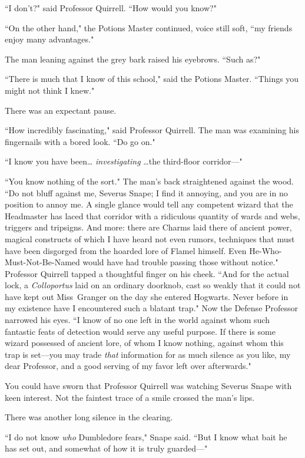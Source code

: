 ``I don't?" said Professor Quirrell. ``How would you know?"

``On the other hand," the Potions Master continued, voice still soft, ``my friends enjoy many advantages."

The man leaning against the grey bark raised his eyebrows. ``Such as?"

``There is much that I know of this school," said the Potions Master. ``Things you might not think I knew."

There was an expectant pause.

``How incredibly fascinating," said Professor Quirrell. The man was examining his fingernails with a bored look. ``Do go on."

``I know you have been{\ldots} \emph{investigating} {\ldots}the third-floor corridor—"

``You know nothing of the sort." The man's back straightened against the wood. ``Do not bluff against me, Severus Snape; I find it annoying, and you are in no position to annoy me. A single glance would tell any competent wizard that the Headmaster has laced that corridor with a ridiculous quantity of wards and webs, triggers and tripsigns. And more: there are Charms laid there of ancient power, magical constructs of which I have heard not even rumors, techniques that must have been disgorged from the hoarded lore of Flamel himself. Even He-Who-Must-Not-Be-Named would have had trouble passing those without notice." Professor Quirrell tapped a thoughtful finger on his cheek. ``And for the actual lock, a \emph{Colloportus} laid on an ordinary doorknob, cast so weakly that it could not have kept out Miss~Granger on the day she entered Hogwarts. Never before in my existence have I encountered such a blatant trap." Now the Defense Professor narrowed his eyes. ``I know of no one left in the world against whom such fantastic feats of detection would serve any useful purpose. If there is some wizard possessed of ancient lore, of whom I know nothing, against whom this trap is set—you may trade \emph{that} information for as much silence as you like, my dear Professor, and a good serving of my favor left over afterwards."

You could have sworn that Professor Quirrell was watching Severus Snape with keen interest. Not the faintest trace of a smile crossed the man's lips.

There was another long silence in the clearing.

``I do not know \emph{who} Dumbledore fears," Snape said. ``But I know what bait he has set out, and somewhat of how it is truly guarded—"

